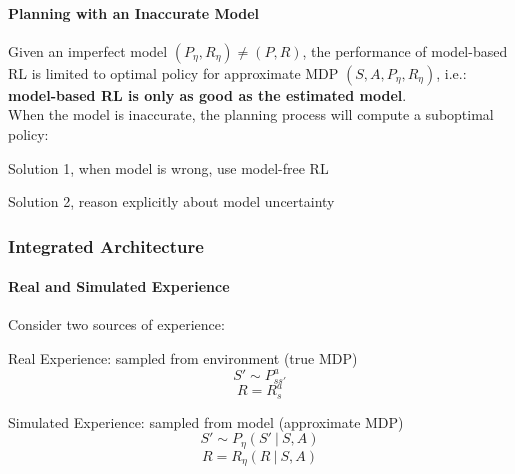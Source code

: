 \documentclass[10pt]{report}
\begin{document}
\paragraph{Planning with an Inaccurate Model} Given an imperfect model $(P_\eta, R_\eta)\neq (P,R)$, the performance of model-based RL is limited to optimal policy for approximate MDP $(S,A,P_\eta,R_\eta)$, i.e.: \textbf{model-based RL is only as good as the estimated model}.\\
When the model is inaccurate, the planning process will compute a suboptimal policy:
\begin{list}{}{}
	\item Solution 1, when model is wrong, use model-free RL
	\item Solution 2, reason explicitly about model uncertainty
\end{list}
\subsubsection{Integrated Architecture}
\paragraph{Real and Simulated Experience} Consider two sources of experience:
\begin{list}{}{}
	\item Real Experience: sampled from environment (true MDP)
	$$S'\sim P_{ss'}^a$$
	$$R = R_s^a$$
	\item Simulated Experience: sampled from model (approximate MDP)
	$$S'\sim P_\eta(S'\:|\:S,A)$$
	$$R = R_\eta(R\:|\:S,A)$$
\end{list}
\end{document}
